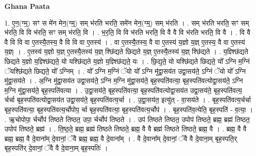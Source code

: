 \documentclass[17pt]{extarticle}
\begin{document}
\textbf{Ghana Paata } \newline

1. ए॒न॒(ग्म्॒) सꣳ स मे॑न मेन॒(ग्म्॒) सम् भ॑रति भरति॒ समे॑न मेन॒(ग्म्॒) सम् भ॑रति । . सम् भ॑रति भरति॒ सꣳ सम् भ॑रति॒ वि वि भ॑रति॒ सꣳ सम् भ॑रति॒ वि । . भ॒र॒ति॒ वि वि भ॑रति भरति॒ वि वै वै वि भ॑रति भरति॒ वि वै । . वि वै वै वि वि वा ए॒तस्यै॒तस्य॒ वै वि वि वा ए॒तस्य॑ । . वा ए॒तस्यै॒तस्य॒ वै वा ए॒तस्य॑ य॒ज्ञो य॒ज्ञ् ए॒तस्य॒ वै वा ए॒तस्य॑ य॒ज्ञ्ः । . ए॒तस्य॑ य॒ज्ञो य॒ज्ञ् ए॒तस्यै॒तस्य॑ य॒ज्ञ् श्छि॑द्यते छिद्यते य॒ज्ञ् ए॒तस्यै॒तस्य॑ य॒ज्ञ् श्छि॑द्यते । . य॒ज्ञ्श्छि॑द्यते छिद्यते य॒ज्ञो य॒ज्ञ्श्छि॑द्यते॒ यो यश्छि॑द्यते य॒ज्ञो य॒ज्ञ्श्छि॑द्यते॒ यः । . छि॒द्य॒ते॒ यो यश्छि॑द्यते छिद्यते॒ यो᳚ ऽग्नि म॒ग्निं ॅयश्छि॑द्यते छिद्यते॒ यो᳚ ऽग्निम् । . यो᳚ ऽग्नि म॒ग्निं ॅयो यो᳚ ऽग्नि मु॑द्वा॒सय॑त उद्वा॒सय॑ते॒ ऽग्निं ॅयो यो᳚ ऽग्नि मु॑द्वा॒सय॑ते । . अ॒ग्नि मु॑द्वा॒सय॑त उद्वा॒सय॑ते॒ ऽग्नि म॒ग्नि मु॑द्वा॒सय॑ते॒ बृह॒स्पति॑वत्या॒ बृह॒स्पति॑वत्योद्वा॒सय॑ते॒ ऽग्नि म॒ग्नि मु॑द्वा॒सय॑ते॒ बृह॒स्पति॑वत्या । . उ॒द्वा॒सय॑ते॒ बृह॒स्पति॑वत्या॒ बृह॒स्पति॑वत्योद्वा॒सय॑त उद्वा॒सय॑ते॒ बृह॒स्पति॑वत्य॒ र्चर्चा बृह॒स्पति॑वत्योद्वा॒सय॑त उद्वा॒सय॑ते॒ बृह॒स्पति॑वत्य॒र्चा । . उ॒द्वा॒सय॑त॒ इत्यु॑त् - वा॒सय॑ते । . बृह॒स्पति॑वत्य॒र्चर्चा बृह॒स्पति॑वत्या॒ बृह॒स्पति॑वत्य॒र्चोपोप॒ र्चा बृह॒स्पति॑वत्या॒ बृह॒स्पति॑वत्य॒र्चोप॑ । . बृह॒स्पति॑व॒त्येति॒ बृह॒स्पति॑ - व॒त्या॒ । . ऋ॒चोपोपा॒ र्चर्चोप॑ तिष्ठते तिष्ठत॒ उपा॒ र्चर्चोप॑ तिष्ठते । . उप॑ तिष्ठते तिष्ठत॒ उपोप॑ तिष्ठते॒ ब्रह्म॒ ब्रह्म॑ तिष्ठत॒ उपोप॑ तिष्ठते॒ ब्रह्म॑ । . ति॒ष्ठ॒ते॒ ब्रह्म॒ ब्रह्म॑ तिष्ठते तिष्ठते॒ ब्रह्म॒ वै वै ब्रह्म॑ तिष्ठते तिष्ठते॒ ब्रह्म॒ वै । . ब्रह्म॒ वै वै ब्रह्म॒ ब्रह्म॒ वै दे॒वाना᳚म् दे॒वानां॒ ॅवै ब्रह्म॒ ब्रह्म॒ वै दे॒वाना᳚म् । . वै दे॒वाना᳚म् दे॒वानां॒ ॅवै वै दे॒वाना॒म् बृह॒स्पति॒र् बृह॒स्पति॑र् दे॒वानां॒ ॅवै वै दे॒वाना॒म् बृह॒स्पतिः॑ । \newline
\end{document}
